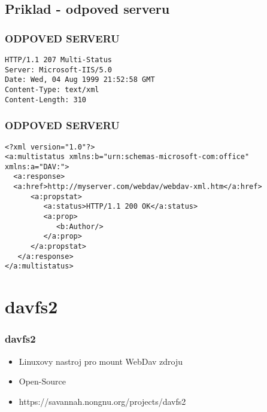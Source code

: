 \documentclass{beamer}
\begin{document}
\subsection{Priklad - odpoved serveru}
\begin{frame}[fragile] %
\frametitle{ODPOVED SERVERU}
\begin{example}
\begin{verbatim}
HTTP/1.1 207 Multi-Status
Server: Microsoft-IIS/5.0
Date: Wed, 04 Aug 1999 21:52:58 GMT
Content-Type: text/xml
Content-Length: 310
   \end{verbatim}
\end{example}
\end{frame}
\begin{frame}[fragile] %
\frametitle{ODPOVED SERVERU}
\begin{example}
\begin{verbatim}
<?xml version="1.0"?>
<a:multistatus xmlns:b="urn:schemas-microsoft-com:office" 
xmlns:a="DAV:">
  <a:response>
  <a:href>http://myserver.com/webdav/webdav-xml.htm</a:href>
      <a:propstat>
         <a:status>HTTP/1.1 200 OK</a:status>
         <a:prop>
            <b:Author/>
         </a:prop>
      </a:propstat>
   </a:response>
</a:multistatus>
   \end{verbatim}
\end{example}
\end{frame}
\section{davfs2}

\begin{frame}
\frametitle{davfs2}
\begin{itemize}
    \item{Linuxovy nastroj pro mount WebDav zdroju}
    \item Open-Source 
    \item{https://savannah.nongnu.org/projects/davfs2} 
\end{itemize}
\end{frame}
\end{document}
